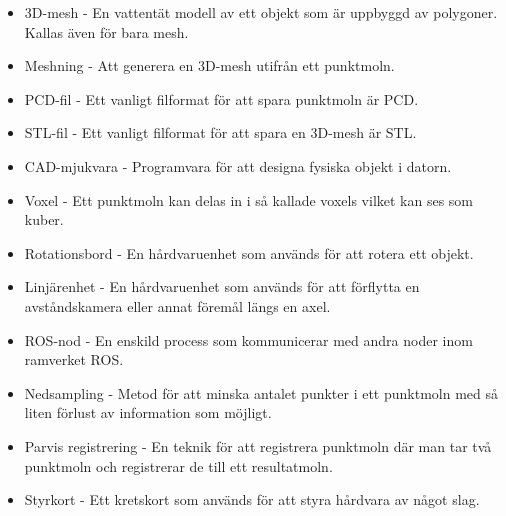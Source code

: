 \begin{itemize}
	\item 3D-mesh - En vattentät modell av ett objekt som är uppbyggd av polygoner. Kallas även för bara mesh.
	\item Meshning - Att generera en 3D-mesh utifrån ett punktmoln.
	\item PCD-fil - Ett vanligt filformat för att spara punktmoln är PCD.
	\item STL-fil - Ett vanligt filformat för att spara en 3D-mesh är STL.
	\item CAD-mjukvara - Programvara för att designa fysiska objekt i datorn.
	\item Voxel - Ett punktmoln kan delas in i så kallade voxels vilket kan ses som kuber.
	\item Rotationsbord - En hårdvaruenhet som används för att rotera ett objekt.
	\item Linjärenhet - En hårdvaruenhet som används för att förflytta en avståndskamera eller annat föremål längs en axel.
	\item ROS-nod - En enskild process som kommunicerar med andra noder inom ramverket ROS.
	\item Nedsampling - Metod för att minska antalet punkter i ett punktmoln med så liten förlust av information som möjligt.
	\item Parvis registrering - En teknik för att registrera punktmoln där man tar två punktmoln och registrerar de till ett resultatmoln.
	\item Styrkort - Ett kretskort som används för att styra hårdvara av något slag.
\end{itemize} 



